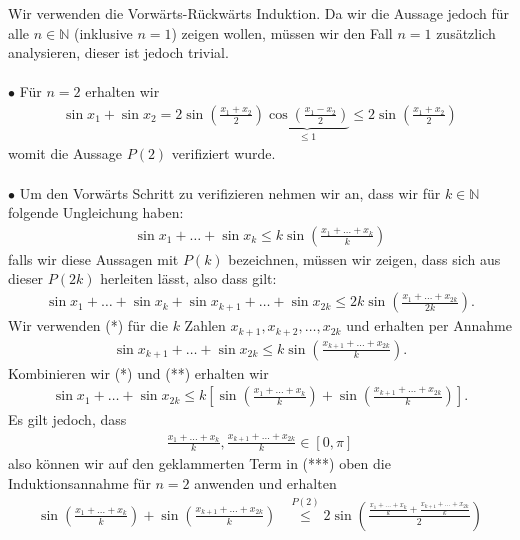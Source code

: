 \documentclass[a4paper, 20]{exam}
\begin{document}
\begin{solution} Wir verwenden die Vorwärts-Rückwärts Induktion. Da wir die Aussage jedoch für alle $n \in \mathbb{N}$ (inklusive $n=1$) zeigen wollen, müssen wir den Fall $n=1$ zusätzlich analysieren, dieser ist jedoch trivial. \\
\\
$\bullet$ Für $n=2$ erhalten wir 
\begin{align*}
\sin x_1 + \sin x_2 = 2 \sin \left( \frac{x_1 + x_2}{2}\right) \underbrace{\cos \left( \frac{x_1-x_2}{2}\right)}_{ \leq 1} \leq 2 \sin \left( \frac{x_1 + x_2}{2}\right)
\end{align*}
womit die Aussage $P(2)$ verifiziert wurde. 
\\
\\
$\bullet$ Um den Vorwärts Schritt zu verifizieren nehmen wir an, dass wir für $k \in \mathbb{N}$ folgende Ungleichung haben:
\begin{align*}
\sin x_1 + \dots + \sin x_k \leq k \sin \left( \frac{x_1 + \dots + x_k}{k}\right) \tag{*}
\end{align*}
falls wir diese Aussagen mit $P(k)$ bezeichnen, müssen wir zeigen, dass sich aus dieser $P(2k)$ herleiten lässt, also dass gilt:
\begin{align*}
\sin x_1 + \dots + \sin x_k + \sin x_{k+1} + \dots + \sin x_{2k} \leq 2k \sin \left( \frac{x_1 + \dots + x_{2k}}{2k}\right).
\end{align*}
Wir verwenden (*) für die $k$ Zahlen $x_{k+1} , x_{k+2}, \dots , x_{2k}$ und erhalten per Annahme 
\begin{align*}
\sin x_{k+1} + \dots + \sin x_{2k} \leq k \sin \left( \frac{x_{k+1}+ \dots + x_{2k}}{k}\right). \tag{**}
\end{align*}
Kombinieren wir (*) und (**) erhalten wir 
\begin{align*}
\sin x_1 + \dots + \sin x_{2k} \leq k \left[ \sin \left( \frac{x_1 + \dots + x_k}{k}\right) + \sin \left( \frac{x_{k+1}+ \dots + x_{2k}}{k}\right) \right]. \tag{***}
\end{align*}
Es gilt jedoch, dass 
\begin{align*}
\frac{x_1 + \dots + x_k}{k}, \frac{x_{k+1} + \dots + x_{2k}}{k} \in [0, \pi]
\end{align*}
also können wir auf den geklammerten Term in (***) oben die Induktionsannahme für $n=2$ anwenden und erhalten 
\begin{align*}
\sin \left( \frac{x_1 + \dots + x_k}{k}\right) + \sin \left( \frac{x_{k+1} + \dots + x_{2k}}{k}\right) &\overset{P(2)} \leq 2 \sin \left( \frac{\frac{x_1 + \dots + x_k}{k}+ \frac{x_{k+1} + \dots + x_{2k}}{k}}{2}\right)  \\

\end{align*}
\end{solution}
\end{document}
